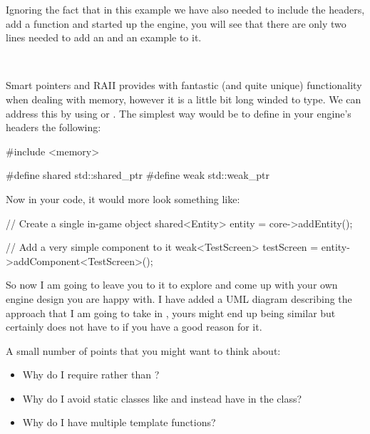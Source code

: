 \documentclass[10pt]{article}
\begin{document}
Ignoring the fact that in this example we have also needed to include
the headers, add a  function and started up the engine, you
will see that there are only two lines needed to add an 
and an example  to it.

\

Smart pointers and RAII provides  with fantastic (and quite
unique) functionality when dealing with memory, however it is a little
bit long winded to type.  We can address this by using 
or . The simplest way would be to define in your engine's
headers the following:

\begin{Code}
#include <memory>

#define shared std::shared_ptr
#define weak std::weak_ptr
\end{Code}

Now in your code, it would more look something like:

\begin{Code}
// Create a single in-game object
shared<Entity> entity = core->addEntity();

// Add a very simple component to it
weak<TestScreen> testScreen = entity->addComponent<TestScreen>();
\end{Code}


So now I am going to leave you to it to explore and come up with your own
engine design you are happy with.  I have added a UML diagram describing
the approach that I am going to take in , yours might end up
being similar but certainly does not have to if you have a good reason
for it.


A small number of points that you might want to think about:

\begin{itemize}

\item Why do I require  rather than ?
\item Why do I avoid static classes like  and instead have  in the  class?
\item Why do I have multiple  template functions?

\end{itemize}
\end{document}
